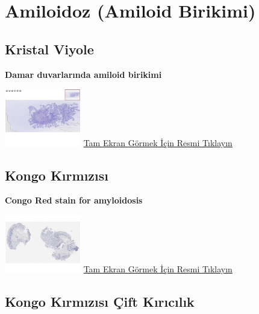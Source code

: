 \documentclass[
  letterpaper,
  DIV=11,
  numbers=noendperiod]{scrreprt}
\begin{document}
\hypertarget{sec-amiloidoz}{%
\chapter{Amiloidoz (Amiloid Birikimi)}\label{sec-amiloidoz}}

\hypertarget{sec-amiloidoz-kristal-viyole}{%
\section{Kristal Viyole}\label{sec-amiloidoz-kristal-viyole}}

\textbf{Damar duvarlarında amiloid birikimi}

\href{https://images.patolojiatlasi.com/amyloid/crystalviolet.html}{\includegraphics[width=0.25\textwidth,height=\textheight]{./screenshots/thumbnail_crystalviolet.png}}
\href{https://images.patolojiatlasi.com/amyloid/crystalviolet.html}{Tam
Ekran Görmek İçin Resmi Tıklayın}

\hypertarget{sec-amiloidoz-kongo-kirmizisi}{%
\section{Kongo Kırmızısı}\label{sec-amiloidoz-kongo-kirmizisi}}

\textbf{Congo Red stain for amyloidosis}

\href{https://images.patolojiatlasi.com/congored/congored.html}{\includegraphics[width=0.25\textwidth,height=\textheight]{./screenshots/thumbnail_congored.png}}
\href{https://images.patolojiatlasi.com/congored/congored.html}{Tam
Ekran Görmek İçin Resmi Tıklayın}

\hypertarget{sec-amiloidoz-kongo-kirmizisi-cift-kiricilik}{%
\section{Kongo Kırmızısı Çift
Kırıcılık}\label{sec-amiloidoz-kongo-kirmizisi-cift-kiricilik}}
\end{document}
